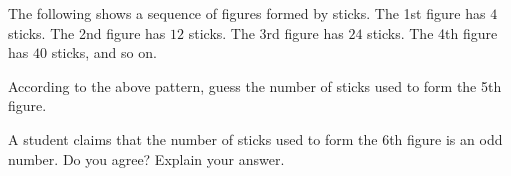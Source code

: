  The following shows a sequence of figures formed by sticks. The 1st figure has $4$ sticks. The 2nd figure has $12$ sticks. The 3rd figure has $24$ sticks. The 4th figure has $40$ sticks, and so on.

\par\vspace{0.5em}
\noindent\hspace*{2em}%

\begin{subparts}
  \item According to the above pattern, guess the number of sticks used to form the 5th figure.
  \item A student claims that the number of sticks used to form the 6th figure is an odd number. Do you agree? Explain your answer.
\end{subparts}

